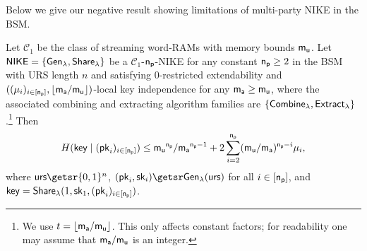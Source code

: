  Below we give our negative result showing limitations of multi-party NIKE in the BSM. 
\begin{theorem}
\label{thm:negative}
Let $\mathcal C_1$ be the class of streaming word-RAMs with memory bounds $\mathsf{m_u}$.
Let $\mathsf{NIKE}=\{{\mathsf{Gen}}_\lambda,{\mathsf{Share}}_\lambda\}$ be a $\mathcal C_1$-$\mathsf{n_p}$-NIKE for any constant $\mathsf{n_p}\geq 2$ in the BSM with URS length $n$ and satisfying $0$-restricted extendability and $((\mu_i)_{i\in[\mathsf{n_p}]},\lfloor\mathsf{m_a}/\mathsf{m_u}\rfloor)$-local key independence for any $\mathsf{m_a}\geq \mathsf{m_u}$, where the associated combining and extracting algorithm families are $\{\mathsf{Combine}_{\lambda},\mathsf{Extract}_{\lambda}\}$.\footnote{We use $t=\lfloor \mathsf{m_a}/\mathsf{m_u}\rfloor$. This only affects constant factors; for readability one may assume that $\mathsf{m_a}/\mathsf{m_u}$ is an integer.} Then
$$
H(\mathsf{key}\mid(\mathsf{pk}_i)_{i\in[\mathsf{n_p}]})
\leq
\mathsf{m_u}^{\mathsf{n_p}}/\mathsf{m_a}^{\mathsf{n_p}-1}
+
2\sum_{i=2}^{\mathsf{n_p}}(\mathsf{m_u}/\mathsf{m_a})^{\mathsf{n_p}-i}\mu_i,
$$
where $\urs\getsr\bin^n$, $(\pk_i,\sk_i)\getsr\gen(\urs)$ for all $i\in[\mathsf{n_p}]$, and $\mathsf{key}={\mathsf{Share}}_\lambda(1,\mathsf{sk}_1,\allowbreak(\mathsf{pk}_i)_{i\in[\mathsf{n_p}]})$.
\end{theorem}

